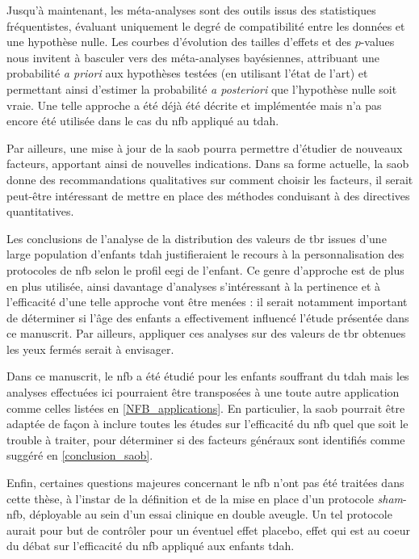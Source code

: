 Jusqu'à maintenant, les méta-analyses sont des outils issus des statistiques fréquentistes,
évaluant uniquement le degré de compatibilité entre les données et une hypothèse nulle.
Les courbes d'évolution des tailles d'effets et des $p$-values nous invitent à basculer vers des méta-analyses bayésiennes,
attribuant une probabilité \textit{a priori} aux hypothèses testées (en utilisant l'état de l'art) et permettant ainsi d'estimer 
la probabilité \textit{a posteriori} que l'hypothèse nulle soit vraie.
Une telle approche a été déjà été décrite et implémentée \citep{Dormuth2016, Spiegelhalter2004} mais n'a pas encore été 
utilisée dans le cas du \gls{nfb} appliqué au \gls{tdah}.  

Par ailleurs, une mise à jour de la \gls{saob} pourra permettre d'étudier de nouveaux facteurs, apportant ainsi de nouvelles  
indications. Dans sa forme actuelle, la \gls{saob} donne des recommandations qualitatives sur comment choisir les facteurs, 
il serait peut-être intéressant de mettre en place des méthodes conduisant à des directives quantitatives.

Les conclusions de l'analyse de la distribution des valeurs de \gls{tbr} issues d'une large population d'enfants \gls{tdah} justifieraient le recours à la 
personnalisation des protocoles de \gls{nfb} selon le profil \gls{eegi} de l'enfant. Ce genre d'approche est de plus en plus utilisée, ainsi davantage 
d'analyses s'intéressant
à la pertinence et à l'efficacité d'une telle approche vont être menées : il serait notamment important de déterminer si l'âge des enfants 
a effectivement influencé l'étude
présentée dans ce manuscrit. Par ailleurs, appliquer ces analyses sur des valeurs de \gls{tbr} obtenues les yeux fermés serait à envisager. 

Dans ce manuscrit, le \gls{nfb} a été étudié pour les enfants souffrant du \gls{tdah} mais les analyses effectuées ici pourraient être 
transposées à une toute autre application comme celles listées en \ref{NFB_applications}.
En particulier, la \gls{saob} pourrait être adaptée de façon à inclure toutes les études sur l'efficacité du \gls{nfb} 
quel que soit le trouble à traiter, pour déterminer si des facteurs généraux sont identifiés comme suggéré en \ref{conclusion_saob}. 

Enfin, certaines questions majeures concernant le \gls{nfb} n'ont pas été traitées dans cette thèse,
à l'instar de la définition et de la mise en place d'un protocole \textit{sham}-\gls{nfb}, déployable au sein d'un essai clinique en double aveugle. 
Un tel protocole 
aurait pour but de contrôler pour un éventuel effet placebo, effet qui est au coeur du débat sur l'efficacité du \gls{nfb} appliqué aux enfants \gls{tdah}. 

